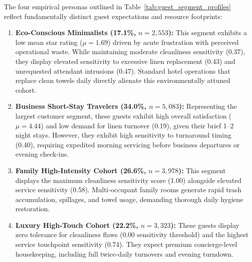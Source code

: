 \documentclass[11pt,a4paper]{article}
\begin{document}
\begin{table}[H]
\centering
\small
\caption{Empirical customer segment profiles and operational sensitivity attributes derived from K-Means clustering ($N=14{,}937$).}
\label{tab:guest_segment_profiles}
\end{table}

The four empirical personas outlined in Table~\ref{tab:guest_segment_profiles} reflect fundamentally distinct guest expectations and resource footprints:
\begin{enumerate}
    \item \textbf{Eco-Conscious Minimalists (17.1\%, $n=2{,}553$):} This segment exhibits a low mean star rating ($\mu = 1.69$) driven by acute frustration with perceived operational waste. While maintaining moderate cleanliness sensitivity (0.37), they display elevated sensitivity to excessive linen replacement (0.43) and unrequested attendant intrusions (0.47). Standard hotel operations that replace clean towels daily directly alienate this environmentally attuned cohort.
    \item \textbf{Business Short-Stay Travelers (34.0\%, $n=5{,}083$):} Representing the largest customer segment, these guests exhibit high overall satisfaction ($\mu = 4.44$) and low demand for linen turnover (0.19), given their brief 1--2 night stays. However, they exhibit high sensitivity to turnaround timing (0.40), requiring expedited morning servicing before business departures or evening check-ins.
    \item \textbf{Family High-Intensity Cohort (26.6\%, $n=3{,}978$):} This segment displays the maximum cleanliness sensitivity score (1.00) alongside elevated service sensitivity (0.58). Multi-occupant family rooms generate rapid trash accumulation, spillages, and towel usage, demanding thorough daily hygiene restoration.
    \item \textbf{Luxury High-Touch Cohort (22.2\%, $n=3{,}323$):} These guests display zero tolerance for cleanliness flaws (0.00 sensitivity threshold) and the highest service touchpoint sensitivity (0.74). They expect premium concierge-level housekeeping, including full twice-daily turnovers and evening turndown.
\end{enumerate}
\end{document}
